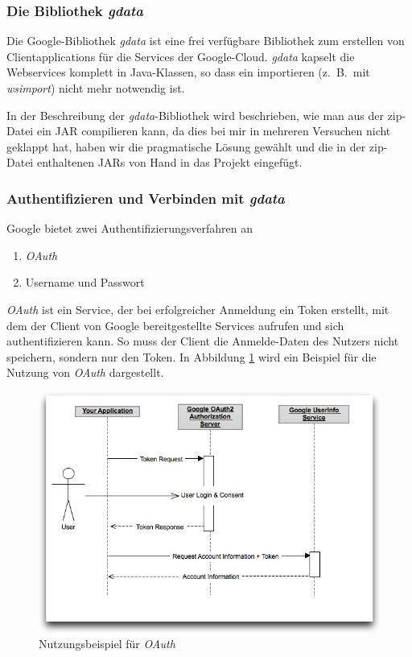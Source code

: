 \subsubsection{Die Bibliothek \emph{gdata}}
Die Google-Bibliothek \emph{gdata} ist eine frei verf\"ugbare Bibliothek zum erstellen von
 Clientapplications für die Services der Google-Cloud.
\emph{gdata} kapselt die Webservices komplett in Java-Klassen, so dass ein importieren
 (z.\ B.\ mit \emph{wsimport}) nicht mehr notwendig ist.

In der Beschreibung der \emph{gdata}-Bibliothek wird beschrieben, wie man aus der zip-Datei
 ein JAR compilieren kann, da dies bei mir in mehreren Versuchen nicht geklappt hat,
 haben wir die pragmatische Lösung gewählt und die in der zip-Datei enthaltenen JARs von Hand
 in das Projekt eingefügt\cite{GO02}.

\subsubsection{Authentifizieren und Verbinden mit \emph{gdata}}
Google bietet zwei Authentifizierungsverfahren an
\begin{enumerate}
	\item\emph{OAuth}
	\item Username und Passwort
\end{enumerate}
\emph{OAuth} ist ein Service, der bei erfolgreicher Anmeldung ein Token erstellt, mit dem
 der Client von Google bereitgestellte Services aufrufen und sich authentifizieren kann.
So muss der Client die Anmelde-Daten des Nutzers nicht speichern, sondern nur den Token.
In Abbildung \ref{fig:google_oauth} wird ein Beispiel f\"ur die Nutzung von \emph{OAuth} dargestellt.
\begin{figure}[h!]
\includegraphics[width=\textwidth]{Bilder/googleOauth.jpg}
\caption{Nutzungsbeispiel f\"ur \emph{OAuth}\cite{GO01}}
\label{fig:google_oauth}
\end{figure}

